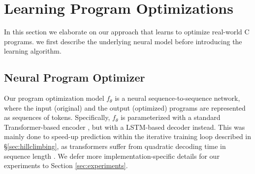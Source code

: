 \documentclass{article}
\begin{document}
\section{Learning Program Optimizations}
\label{sec:learning}


In this section we elaborate on our approach that learns to optimize real-world C programs. 
we first describe the underlying neural model before introducing the learning algorithm.


\subsection{Neural Program Optimizer}

 

Our program optimization model $f_{\theta}$ is a neural sequence-to-sequence network, where the input (original) and the output (optimized) programs are represented as sequences of tokens.
Specifically, $f_{\theta}$ is parameterized with a standard Transformer-based encoder \citep{vaswani2017attention}, but with a LSTM-based decoder \citep{hochreiter1997long,chen-etal-2018-best} instead.
This was mainly done to speed-up prediction within the iterative training loop described in \S\ref{sec:hillclimbing}, as transformers suffer from quadratic decoding time in sequence length \citep{chen-etal-2018-best}. We defer more implementation-specific details for our experiments to Section \ref{sec:experiments}. 
\end{document}
